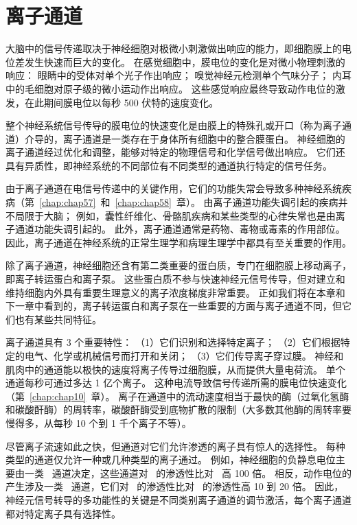 \chapter{离子通道} \label{chap:chap8}

大脑中的信号传递取决于神经细胞对极微小刺激做出响应的能力，即细胞膜上的电位差发生快速而巨大的变化。
在感觉细胞中，膜电位的变化是对微小物理刺激的响应：
眼睛中的受体对单个光子作出响应；
嗅觉神经元检测单个气味分子；
内耳中的毛细胞对原子级的微小运动作出响应。
这些感觉响应最终导致动作电位的激发，在此期间膜电位以每秒 500 伏特的速度变化。


整个神经系统信号传导的膜电位的快速变化是由膜上的特殊孔或开口（称为离子通道）介导的，离子通道是一类存在于身体所有细胞中的整合膜蛋白。
神经细胞的离子通道经过优化和调整，能够对特定的物理信号和化学信号做出响应。
它们还具有异质性，即神经系统的不同部位有不同类型的通道执行特定的信号任务。


由于离子通道在电信号传递中的关键作用，它们的功能失常会导致多种神经系统疾病（第~\ref{chap:chap57}~和~\ref{chap:chap58}~章）。
由离子通道功能失调引起的疾病并不局限于大脑；
例如，囊性纤维化、骨骼肌疾病和某些类型的心律失常也是由离子通道功能失调引起的。
此外，离子通道通常是药物、毒物或毒素的作用部位。
因此，离子通道在神经系统的正常生理学和病理生理学中都具有至关重要的作用。


除了离子通道，神经细胞还含有第二类重要的蛋白质，专门在细胞膜上移动离子，即离子转运蛋白和离子泵。
这些蛋白质不参与快速神经元信号传导，但对建立和维持细胞内外具有重要生理意义的离子浓度梯度非常重要。
正如我们将在本章和下一章中看到的，离子转运蛋白和离子泵在一些重要的方面与离子通道不同，但它们也有某些共同特征。


离子通道具有 3 个重要特性：
（1）它们识别和选择特定离子；
（2）它们根据特定的电气、化学或机械信号而打开和关闭；
（3）它们传导离子穿过膜。
神经和肌肉中的通道能以极快的速度将离子传导过细胞膜，从而提供大量电荷流。
单个通道每秒可通过多达 1 亿个离子。
这种电流导致信号传递所需的膜电位快速变化（第~\ref{chap:chap10}~章）。
离子在通道中的流动速度相当于最快的酶（过氧化氢酶和碳酸酐酶）的周转率，碳酸酐酶受到底物扩散的限制（大多数其他酶的周转率要慢得多，从每秒 10 个到 1 千个离子不等）。


尽管离子流速如此之快，但通道对它们允许渗透的离子具有惊人的选择性。
每种类型的通道仅允许一种或几种类型的离子通过。
例如，神经细胞的负静息电位主要由一类~ 通道决定，这些通道对~ 的渗透性比对~ 高 100 倍。
相反，动作电位的产生涉及一类~ 通道，它们对~ 的渗透性比对~ 的渗透性高 10 到 20 倍。
因此，神经元信号转导的多功能性的关键是不同类别离子通道的调节激活，每个离子通道都对特定离子具有选择性。


